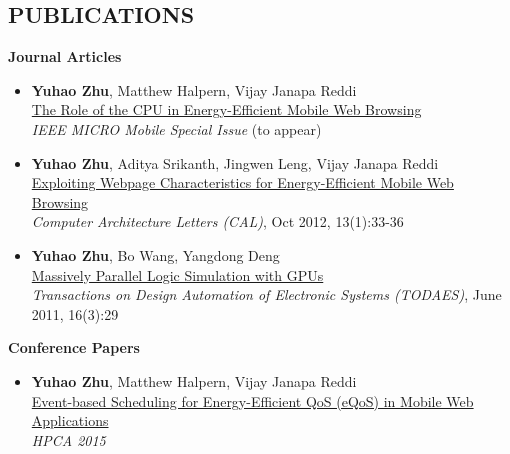 \documentclass[margin, 9pt]{res} %
\begin{document}
\begin{resume}
 
\section{PUBLICATIONS}

{\large\textbf{Journal Articles}}

\begin{itemize}[leftmargin=*] \itemsep -2pt
	\item \textbf{Yuhao Zhu}, Matthew Halpern, Vijay Janapa Reddi\\
          \href{}{The Role of the CPU in Energy-Efficient Mobile Web Browsing}\\
          \textit{IEEE MICRO Mobile Special Issue} (to appear)

	\item \textbf{Yuhao Zhu}, Aditya Srikanth, Jingwen Leng, Vijay Janapa Reddi\\
          \href{http://yuhaozhu.com/pubs/cal12.pdf}{Exploiting Webpage Characteristics for Energy-Efficient Mobile Web Browsing}\\
          \textit{Computer Architecture Letters (CAL)}, Oct 2012, 13(1):33-36

	\item \textbf{Yuhao Zhu}, Bo Wang, Yangdong Deng\\
          \href{http://yuhaozhu.com/pubs/todaes11.pdf}{Massively Parallel Logic Simulation with GPUs}\\
          \textit{Transactions on Design Automation of Electronic Systems (TODAES)}, June 2011, 16(3):29
\end{itemize}

\vspace*{7pt}
{\large\textbf{Conference Papers}}

\begin{itemize}[leftmargin=*] \itemsep -2pt
	\item \textbf{Yuhao Zhu}, Matthew Halpern, Vijay Janapa Reddi\\
          \href{}{Event-based Scheduling for Energy-Efficient QoS (eQoS) in Mobile Web Applications}\\
          \textit{HPCA 2015}


\end{itemize}
\end{resume}
\end{document}
